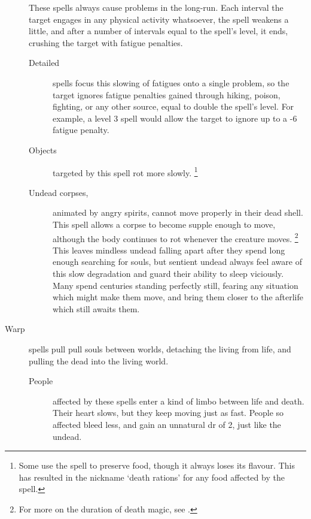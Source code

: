 \begin{multicols}{2}
\begin{description}
    These spells always cause problems in the long-run.
    Each interval the target engages in any physical activity whatsoever, the spell weakens a little, and after a number of \glspl{interval} equal to the spell's level, it ends, crushing the target with \gls{fatigue} penalties.
    \begin{description}
      \item[Detailed]
        spells focus this slowing of \glspl{fatigue} onto a single problem, so the target ignores \gls{fatigue} penalties gained through hiking, poison, fighting, or any other source, equal to double the spell's level.
        For example, a level 3 spell would allow the target to ignore up to a -6 \gls{fatigue} penalty.
      \item[Objects]
        targeted by this spell rot more slowly.
        \footnote{Some use the spell to preserve food, though it always loses its flavour.
        This has resulted in the nickname `death rations' for any food affected by the spell.}
      \item[Undead corpses,]
        animated by angry spirits, cannot move properly in their dead shell.
        This spell allows a corpse to become supple enough to move, although the body continues to rot whenever the creature moves.%
        \footnote{For more on the duration of death magic, see .}
        This leaves mindless undead falling apart after they spend long enough searching for souls, but sentient undead always feel aware of this slow degradation and guard their ability to sleep viciously.
        Many spend centuries standing perfectly still, fearing any situation which might make them move, and bring them closer to the afterlife which still awaits them.
    \end{description}
  \item[Warp]
    spells pull pull souls between worlds, detaching the living from life, and pulling the dead into the living world.
    \begin{description}
      \item[People]
        affected by these spells enter a kind of limbo between life and death.
        Their heart slows, but they keep moving just as fast.
        People so affected bleed less, and gain an unnatural \gls{dr} of 2, just like the undead.


\end{description}
\end{description}
\end{multicols}
